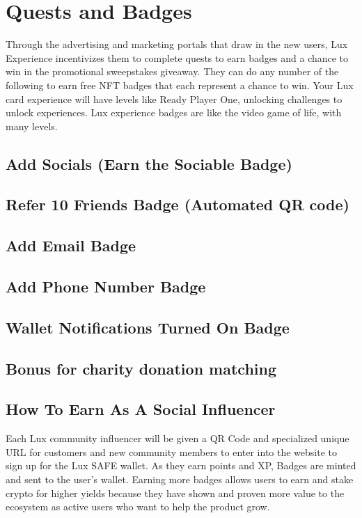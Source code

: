 \documentclass[11pt]{article}
\begin{document}
\section{Quests and Badges}

Through the advertising and marketing portals that draw in the new users, Lux Experience incentivizes them to complete quests to earn badges and a chance to win in the promotional sweepstakes giveaway. They can do any number of the following to earn free NFT badges that each represent a chance to win. Your Lux card experience will have levels like Ready Player One, unlocking challenges to unlock experiences. Lux experience badges are like the video game of life, with many levels.


\subsection{Add Socials (Earn the Sociable Badge)}

\subsection{Refer 10 Friends Badge (Automated QR code)}

\subsection{Add Email Badge}

\subsection{Add Phone Number Badge}

\subsection{Wallet Notifications Turned On Badge}

\subsection{Bonus for charity donation matching}

\subsection{How To Earn As A Social Influencer}

Each Lux community influencer will be given a QR Code and specialized unique URL for customers and new community members to enter into the website to sign up for the Lux SAFE wallet. As they earn points and XP, Badges are minted and sent to the user's wallet. Earning more badges allows users to earn and stake crypto for higher yields because they have shown and proven more value to the ecosystem as active users who want to help the product grow.
\end{document}
